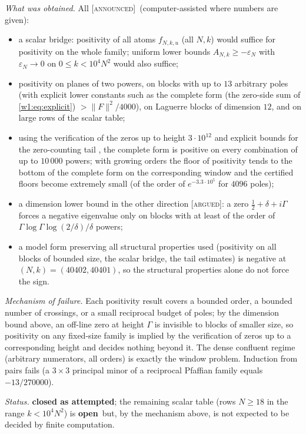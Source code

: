 \documentclass[11pt]{amsart}
\theoremstyle{definition}
\theoremstyle{remark}
\numberwithin{equation}{section}
\newcommand{\stag}[1]{\textsc{[#1]}}
\newcommand{\ARGUED}{\stag{argued}}
\newcommand{\ANNOUNCED}{\stag{announced}}
\newcommand{\rtag}[1]{\textbf{\small\textsf{#1}}}
\newcommand{\closedA}{\rtag{closed as attempted}}
\newcommand{\openR}{\rtag{open}}
\newcommand{\entry}[1]{\par\smallskip\noindent\textit{#1.}\enspace}
\begin{document}
\entry{What was obtained} All \ANNOUNCED\ (computer-assisted where numbers are given):
\begin{itemize}
\item a scalar bridge: positivity of all atoms $f_{N,k,u}$ (all $N,k$) would suffice for positivity on the whole family;
uniform lower bounds $A_{N,k}\ge-\varepsilon_N$ with $\varepsilon_N\to0$ on $0\le k<10^4N^2$ would also suffice;
\item positivity on planes of two powers, on blocks with up to $13$ arbitrary poles (with explicit lower constants such as
the complete form (the zero-side sum of \eqref{w1:eq:explicit}) $>\|F\|^2/4000$), on Laguerre blocks of dimension $12$, and on large rows of the scalar table;
\item using the verification of the zeros up to height $3\cdot10^{12}$ \cite{PlattTrudgian2021} and explicit bounds for the
zero-counting tail \cite{Trudgian2014}, the complete form is positive on every combination of up to $10\,000$ powers;
with growing orders the floor of positivity tends to the bottom of the complete form on the corresponding window and
the certified floors become extremely small (of the order of $e^{-3.3\cdot10^5}$ for $4096$ poles);
\item a dimension lower bound in the other direction \ARGUED: a zero $\frac12+\delta+i\Gamma$ forces a negative eigenvalue
only on blocks with at least of the order of $\Gamma\log\Gamma\log(2/\delta)/\delta$ powers;
\item a model form preserving all structural properties used (positivity on all blocks of bounded size, the scalar bridge,
the tail estimates) is negative at $(N,k)=(40402,40401)$, so the structural properties alone do not force the sign.
\end{itemize}

\entry{Mechanism of failure} Each positivity result covers a bounded order, a bounded number of crossings, or a small
reciprocal budget of poles; by the dimension bound above, an off-line zero at height $\Gamma$ is invisible to blocks of
smaller size, so positivity on any fixed-size family is implied by the verification of zeros up to a corresponding height
and decides nothing beyond it. The dense confluent regime (arbitrary numerators, all orders) is exactly the window problem.
Induction from pairs fails (a $3\times3$ principal minor of a reciprocal Pfaffian family equals $-13/270000$).

\entry{Status} \closedA; the remaining scalar table (rows $N\ge18$ in the range $k<10^4N^2$) is \openR\ but, by the
mechanism above, is not expected to be decided by finite computation.
\end{document}
